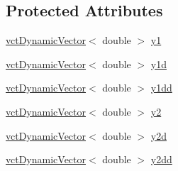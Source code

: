 \subsection*{Protected Attributes}
\begin{DoxyCompactItemize}
\item 
\hyperlink{classvct_dynamic_vector}{vct\-Dynamic\-Vector}$<$ double $>$ \hyperlink{classrob_function_rn_aadf26230a697fedca000dac29ae27129}{y1}
\item 
\hyperlink{classvct_dynamic_vector}{vct\-Dynamic\-Vector}$<$ double $>$ \hyperlink{classrob_function_rn_a0cd776a1eec33965d8cdce69c7c12902}{y1d}
\item 
\hyperlink{classvct_dynamic_vector}{vct\-Dynamic\-Vector}$<$ double $>$ \hyperlink{classrob_function_rn_a44e2cfac47df0d9324c0d7d6251d680f}{y1dd}
\item 
\hyperlink{classvct_dynamic_vector}{vct\-Dynamic\-Vector}$<$ double $>$ \hyperlink{classrob_function_rn_a982a35e7e6f235da34765d3ceeb91109}{y2}
\item 
\hyperlink{classvct_dynamic_vector}{vct\-Dynamic\-Vector}$<$ double $>$ \hyperlink{classrob_function_rn_a99d86533626d78aa644816936ec01ac2}{y2d}
\item 
\hyperlink{classvct_dynamic_vector}{vct\-Dynamic\-Vector}$<$ double $>$ \hyperlink{classrob_function_rn_af67e2c772c0550231dd2b768adbae702}{y2dd}
\end{DoxyCompactItemize}


